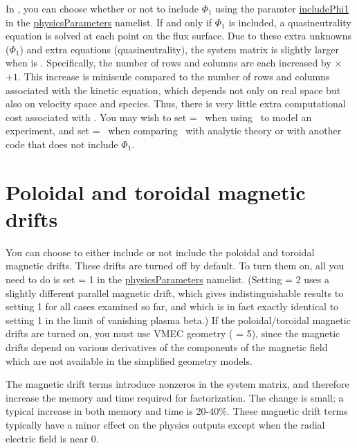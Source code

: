 In \sfincs, you can choose whether or not to
include $\Phi_1$ using the paramter {\ttfamily \hyperlink{includePhi1}{includePhi1}} in the 
{\ttfamily \hyperref[sec:physicsParameters]{physicsParameters}}
namelist.  If and only if $\Phi_1$ is included, a quasineutrality equation is solved
at each point on the flux surface.  Due to these extra unknowns ($\Phi_1$) and extra equations
(quasineutrality), the system matrix is slightly larger when  is \true.
Specifically, the number of rows and columns are each increased by \Ntheta$\times$\Nzeta$+1$.  This increase is miniscule compared
to the number of rows and columns associated with the kinetic equation, which depends not only on real space
but also on velocity space and species.  Thus, there is very little extra computational cost associated
with .  You may wish to set  = \true~when
using \sfincs~to model an experiment, and set  = \false~when
comparing \sfincs~with analytic theory or with another code that does not include $\Phi_1$.

\section{Poloidal and toroidal magnetic drifts}
\label{sec:magneticDrifts}

You can choose to either include or not include the poloidal and toroidal magnetic drifts.
These drifts are turned off by default.  To turn them on, all you need to do is
set  = 1 in the {\ttfamily \hyperref[sec:physicsParameters]{physicsParameters}} namelist.
(Setting  = 2 uses a slightly different parallel magnetic drift, which gives
indistinguishable results to setting 1 for all cases examined so far, and which is in fact exactly identical to setting 1
in the limit of vanishing plasma beta.)
If the poloidal/toroidal magnetic drifts are turned on, you must use VMEC
geometry ( = 5), since the magnetic drifts
depend on various derivatives of the components of the magnetic field which
are not available in the simplified geometry models.

The magnetic drift terms introduce nonzeros in the system matrix,
and therefore increase the memory and time required for factorization.
The change is small; a typical increase in both memory and time is 20-40\%.
These magnetic drift terms typically have a minor effect on the physics outputs except when the radial
electric field is near 0.

